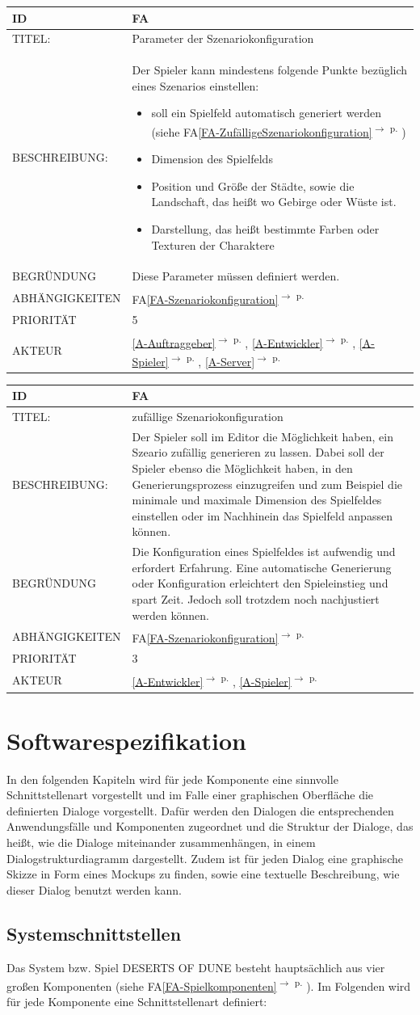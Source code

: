 \documentclass[12pt]{article}
\newcounter{fa}
\newcommand{\fa}[7]{
\refstepcounter{fa}\label{#7}
\begin{tabularx}{16cm}{l|X}
\textbf{ID} & \textbf{FA\arabic{fa}} \\
\hline
TITEL: & #1 \\
\hline
BESCHREIBUNG: & #2 \\
\hline
BEGRÜNDUNG & #3 \\ 
\hline
ABHÄNGIGKEITEN & #4\\ 
\hline 
PRIORITÄT & #5\\ 
\hline 
AKTEUR & #6
\end{tabularx}
\vspace*{0.75cm}
}
\newcommand{\rref}[1]{\ref{#1}\textsuperscript{$\rightarrow$ p. \pageref{#1}}}
\newcommand{\faref}[1]{FA\ref{#1}\textsuperscript{$\rightarrow$ p. \pageref{#1}}}
\begin{document}
\fa{Parameter der Szenariokonfiguration}{Der Spieler kann mindestens folgende Punkte bezüglich eines Szenarios einstellen: 
\begin{itemize}
    \item soll ein Spielfeld automatisch generiert werden (siehe \faref{FA-ZufälligeSzenariokonfiguration})
    \item Dimension des Spielfelds
    \item Position und Größe der Städte, sowie die Landschaft, das heißt wo Gebirge oder Wüste ist. 
    \item Darstellung, das heißt bestimmte Farben oder Texturen der Charaktere
\end{itemize}}{Diese Parameter müssen definiert werden.}{\faref{FA-Szenariokonfiguration}}{5}{\rref{A-Auftraggeber}, \rref{A-Entwickler}, \rref{A-Spieler}, \rref{A-Server}}{FA-Parameter-Szenariokonfiguration}


\fa{zufällige Szenariokonfiguration}{Der Spieler soll im Editor die Möglichkeit haben, ein Szeario zufällig generieren zu lassen. Dabei soll der Spieler ebenso die Möglichkeit haben, in den Generierungsprozess einzugreifen und zum Beispiel die minimale und maximale Dimension des Spielfeldes einstellen oder im Nachhinein das Spielfeld anpassen können.
}{Die Konfiguration eines Spielfeldes ist aufwendig und erfordert Erfahrung. Eine automatische Generierung oder Konfiguration erleichtert den Spieleinstieg und spart Zeit. Jedoch soll trotzdem noch nachjustiert werden können.}{\faref{FA-Szenariokonfiguration}}{3}{\rref{A-Entwickler}, \rref{A-Spieler}}{FA-ZufälligeSzenariokonfiguration}

\section{Softwarespezifikation}
In den folgenden Kapiteln wird für jede Komponente eine sinnvolle Schnittstellenart vorgestellt und im Falle einer graphischen Oberfläche die definierten Dialoge vorgestellt. Dafür werden den Dialogen die entsprechenden Anwendungsfälle und Komponenten zugeordnet und die Struktur der Dialoge, das heißt, wie die Dialoge miteinander zusammenhängen, in einem Dialogstrukturdiagramm dargestellt. Zudem ist für jeden Dialog eine graphische Skizze in Form eines \glqq{}Mockups\grqq{} zu finden, sowie eine textuelle Beschreibung, wie dieser Dialog benutzt werden kann. 
\subsection{Systemschnittstellen}
Das System bzw. Spiel \textsc{DESERTS OF DUNE} besteht hauptsächlich aus vier großen Komponenten (siehe \faref{FA-Spielkomponenten}). Im Folgenden wird für jede Komponente eine Schnittstellenart definiert: 
\end{document}
